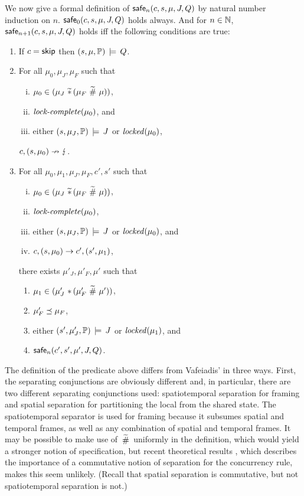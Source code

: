 \documentclass[11pt]{report}
\begin{document}
We now give a formal definition of $\mathsf{safe}_{n}(c,s,\mu,J,Q)$ by natural number induction on $n$. $\mathsf{safe}_{0}(c,s,\mu,J,Q)$ holds always. And for $n \in \mathbb{N}$, $\mathsf{safe}_{n+1}(c,s,\mu,J,Q)$ holds iff the following conditions are true: \begin{enumerate}
  \item If $c = \operatorname{\mathsf{skip}}$ then $(s,\mu,\mathbb{P}) \,\models\, Q$.

  \item For all $\mu_0,\mu_J,\mu_F$ such that \begin{enumerate}[(i)]
    \item $\mu_0 \in (\mu_J \operatorname{\,\widetilde{\ast}\,} (\mu_F \operatorname{\,\widetilde{\#}\,} \mu))$,
    \item $\text{\textit{lock-complete}}(\mu_0)$, and
    \item either $(s,\mu_J,\mathbb{P}) \,\models\, J$ or $\mathit{locked}(\mu_0)$,
  \end{enumerate} $c,(s,\mu_0) \nrightarrow \lightning$.

  \item For all $\mu_0,\mu_1,\mu_J,\mu_F,c',s'$ such that \begin{enumerate}[(i)]
    \item $\mu_0 \in (\mu_J \operatorname{\,\widetilde{\ast}\,} (\mu_F \operatorname{\,\widetilde{\#}\,} \mu))$,
    \item $\text{\textit{lock-complete}}(\mu_0)$,
    \item either $(s,\mu_J,\mathbb{P}) \,\models\, J$ or $\mathit{locked}(\mu_0)$, and 
    \item $c,(s,\mu_0) \rightarrow c',(s',\mu_1)$,
  \end{enumerate} there exists $\mu'_J,\mu'_F,\mu'$ such that \begin{enumerate}
    \item $\mu_1 \in (\mu'_J \operatorname{\,\ast\,} (\mu'_F \operatorname{\,\widetilde{\#}\,} \mu'))$,
    \item $\mu'_F \preceq \mu_F$,
    \item either $(s',\mu'_J,\mathbb{P}) \,\models\, J$ or $\mathit{locked}(\mu_1)$, and
    \item $\mathsf{safe}_{n}(c',s',\mu',J,Q)$.
  \end{enumerate}

\end{enumerate}

The definition of the predicate above differs from Vafeiadis' in three ways. First, the separating conjunctions are obviously different and, in particular, there are two different separating conjunctions used: spatiotemporal separation for framing and spatial separation for partitioning the local from the shared state. The spatiotemporal separator is used for framing because it subsumes spatial and temporal frames, as well as any combination of spatial and temporal frames. It may be possible to make use of $\operatorname{\,\widetilde{\#}\,}$ uniformly in the definition, which would yield a stronger notion of specification, but recent theoretical results \cite{DBLP:conf/concur/HoareHMOPS11}, which describes the importance of a commutative notion of separation for the concurrency rule, makes this seem unlikely. (Recall that spatial separation is commutative, but not spatiotemporal separation is not.)
\end{document}
